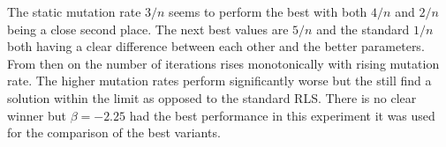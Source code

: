 The static mutation rate $3/n$ seems to perform the best with both $4/n$ and $2/n$ being a close second place. The next best values are $5/n$ and the standard $1/n$ both having a clear difference between each other and the better parameters. From then on the number of iterations rises monotonically with rising mutation rate. The higher mutation rates perform significantly worse but the still find a solution within the limit as opposed to the standard RLS. There is no clear winner but $\beta=-2.25$ had the best performance in this experiment it was used for the comparison of the best variants.